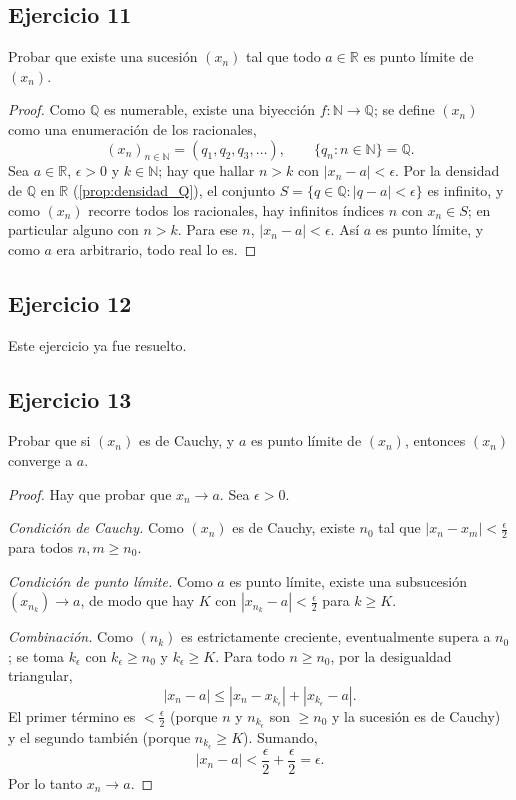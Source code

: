 \documentclass[11pt, a4paper]{article}
\begin{document}
\subsection*{Ejercicio 11}

Probar que existe una sucesión $(x_n)$ tal que todo $a \in \mathbb{R}$ es punto límite de $(x_n)$.

\begin{proof}
Como $\mathbb{Q}$ es numerable, existe una biyección $f: \mathbb{N} \to \mathbb{Q}$; se define
$(x_n)$ como una enumeración de los racionales,
$$ (x_n)_{n \in \mathbb{N}} = (q_1, q_2, q_3, \dots), \qquad \{q_n : n \in \mathbb{N}\} = \mathbb{Q}. $$
Sea $a \in \mathbb{R}$, $\epsilon > 0$ y $k \in \mathbb{N}$; hay que hallar $n > k$ con
$|x_n - a| < \epsilon$. Por la densidad de $\mathbb{Q}$ en $\mathbb{R}$ (\ref{prop:densidad_Q}), el conjunto
$S = \{ q \in \mathbb{Q} : |q - a| < \epsilon \}$ es infinito, y como $(x_n)$ recorre todos los
racionales, hay infinitos índices $n$ con $x_n \in S$; en particular alguno con $n > k$. Para ese
$n$, $|x_n - a| < \epsilon$. Así $a$ es punto límite, y como $a$ era arbitrario, todo real lo es.
\end{proof}

\subsection*{Ejercicio 12}

Este ejercicio ya fue resuelto.

\subsection*{Ejercicio 13}

Probar que si $(x_{n})$ es de Cauchy, y $a$ es punto límite de $(x_{n})$, entonces $(x_{n})$
converge a $a$.

\begin{proof}
Hay que probar que $x_n \to a$. Sea $\epsilon > 0$.

\textit{Condición de Cauchy.} Como $(x_n)$ es de Cauchy, existe $n_0$ tal que
$|x_n - x_m| < \frac{\epsilon}{2}$ para todos $n, m \ge n_0$.

\textit{Condición de punto límite.} Como $a$ es punto límite, existe una subsucesión
$(x_{n_k}) \to a$, de modo que hay $K$ con $|x_{n_k} - a| < \frac{\epsilon}{2}$ para $k \ge K$.

\textit{Combinación.} Como $(n_k)$ es estrictamente creciente, eventualmente supera a $n_0$; se toma
$k_{\epsilon}$ con $k_{\epsilon} \ge n_0$ y $k_{\epsilon} \ge K$. Para todo $n \ge n_0$, por la
desigualdad triangular,
$$ |x_n - a| \le |x_n - x_{k_{\epsilon}}| + |x_{k_{\epsilon}} - a|. $$
El primer término es $< \frac{\epsilon}{2}$ (porque $n$ y $n_{k_{\epsilon}}$ son $\ge n_0$ y la
sucesión es de Cauchy) y el segundo también (porque $n_{k_{\epsilon}} \ge K$). Sumando,
$$ |x_n - a| < \frac{\epsilon}{2} + \frac{\epsilon}{2} = \epsilon. $$
Por lo tanto $x_n \to a$.
\end{proof}
\end{document}
